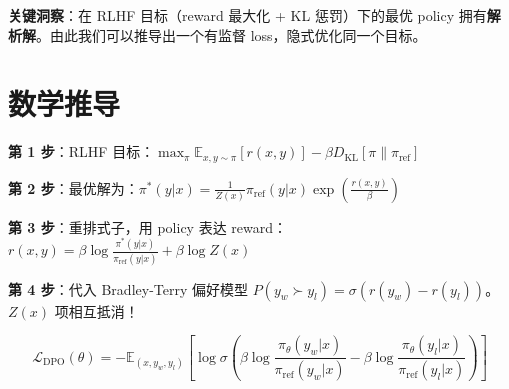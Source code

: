 \textbf{关键洞察}：在 RLHF 目标（reward 最大化 + KL 惩罚）下的最优 policy 拥有\textbf{解析解}。由此我们可以推导出一个有监督 loss，隐式优化同一个目标。

\section{数学推导}
\label{mathematical-derivation}
\label{the-dpo-algorithm}

\textbf{第 1 步}：RLHF 目标：$\max_\pi \mathbb{E}_{x,y\sim\pi}[r(x,y)] - \beta D_\text{KL}[\pi\|\pi_\text{ref}]$

\textbf{第 2 步}：最优解为：$\pi^*(y|x) = \frac{1}{Z(x)} \pi_\text{ref}(y|x) \exp\left(\frac{r(x,y)}{\beta}\right)$

\textbf{第 3 步}：重排式子，用 policy 表达 reward：$r(x,y) = \beta \log \frac{\pi^*(y|x)}{\pi_\text{ref}(y|x)} + \beta \log Z(x)$

\textbf{第 4 步}：代入 Bradley-Terry 偏好模型 $P(y_w \succ y_l) = \sigma(r(y_w) - r(y_l))$。$Z(x)$ 项相互抵消！

\begin{equation}
\boxed{\mathcal{L}_\text{DPO}(\theta) = -\mathbb{E}_{(x, y_w, y_l)}\left[\log\sigma\left(\beta\log\frac{\pi_\theta(y_w|x)}{\pi_\text{ref}(y_w|x)} - \beta\log\frac{\pi_\theta(y_l|x)}{\pi_\text{ref}(y_l|x)}\right)\right]}
\end{equation}

